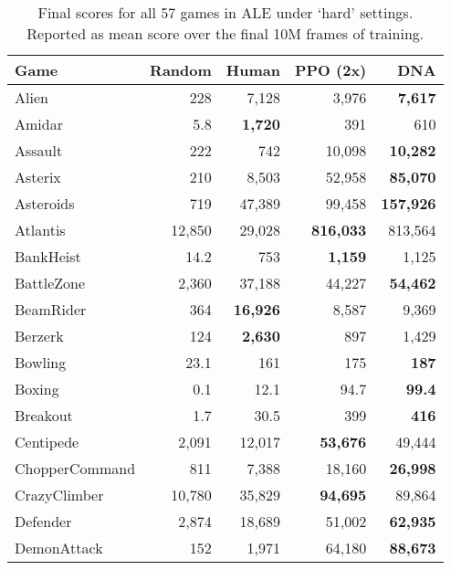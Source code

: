 \documentclass{article}
\begin{document}
\begin{table}[h]
    \footnotesize
    \caption{Final scores for all 57 games in ALE under `hard' settings.  Reported as mean score over the final 10M frames of training.}
    \label{tab:a57_full_hard}
    \centering
    \begin{tabular}{l r r r r}
\toprule
Game                 & Random     & Human      & PPO (2x)   & DNA         \\
\midrule
Alien                & 228        & 7,128      & 3,976      & \textbf{7,617} \\
Amidar               & 5.8        & \textbf{1,720} & 391        & 610        \\
Assault              & 222        & 742        & 10,098     & \textbf{10,282} \\
Asterix              & 210        & 8,503      & 52,958     & \textbf{85,070} \\
Asteroids            & 719        & 47,389     & 99,458     & \textbf{157,926} \\
Atlantis             & 12,850     & 29,028     & \textbf{816,033} & 813,564    \\
BankHeist            & 14.2       & 753        & \textbf{1,159} & 1,125      \\
BattleZone           & 2,360      & 37,188     & 44,227     & \textbf{54,462} \\
BeamRider            & 364        & \textbf{16,926} & 8,587      & 9,369      \\
Berzerk              & 124        & \textbf{2,630} & 897        & 1,429      \\
Bowling              & 23.1       & 161        & 175        & \textbf{187} \\
Boxing               & 0.1        & 12.1       & 94.7       & \textbf{99.4} \\
Breakout             & 1.7        & 30.5       & 399        & \textbf{416} \\
Centipede            & 2,091      & 12,017     & \textbf{53,676} & 49,444     \\
ChopperCommand       & 811        & 7,388      & 18,160     & \textbf{26,998} \\
CrazyClimber         & 10,780     & 35,829     & \textbf{94,695} & 89,864     \\
Defender             & 2,874      & 18,689     & 51,002     & \textbf{62,935} \\
DemonAttack          & 152        & 1,971      & 64,180     & \textbf{88,673} \\

\end{tabular}
\end{table}
\end{document}
